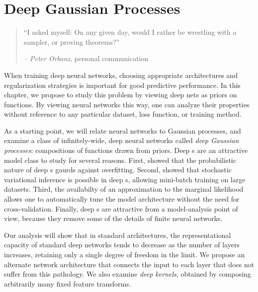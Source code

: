 
\inbpdocument


\chapter{Deep Gaussian Processes}
\label{ch:deep-limits}

\begin{quotation}
``I asked myself: On any given day, would I rather be wrestling with a sampler, or proving theorems?''

\hspace*{\fill} \emph{ -- Peter Orbanz}, personal communication
\end{quotation}


When training deep neural networks, choosing appropriate architectures and regularization strategies is important for good predictive performance.
In this chapter, we propose to study this problem by viewing deep nets as priors on functions.
By viewing neural networks this way, one can analyze their properties without reference to any particular dataset, loss function, or training method.

As a starting point, we will relate neural networks to Gaussian processes, and examine a class of infinitely-wide, deep neural networks called \emph{deep Gaussian processes}: compositions of functions drawn from \gp{} priors.
Deep \gp{}s are an attractive model class to study for several reasons.
First, \citet{damianou2012deep} showed that the probabilistic nature of deep \gp{}s gaurds against overfitting.
Second, \citet{hensman2014deep} showed that stochastic variational inference is possible in deep \gp{}s, allowing mini-batch training on large datasets.
Third, the availabilty of an approximation to the marginal likelihood allows one to automatically tune the model architecture without the need for cross-validation.
Finally, deep \gp{}s are attractive from a model-analysis point of view, because they remove some of the details of finite neural networks. %

Our analysis will show that in standard architectures, the representational capacity of standard deep networks tends to decrease as the number of layers increases, retaining only a single degree of freedom in the limit.
We propose an alternate network architecture that connects the input to each layer that does not suffer from this pathology.
We also examine \emph{deep kernels}, obtained by composing arbitrarily many fixed feature transforms.

